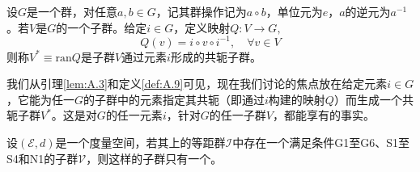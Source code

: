 \documentclass[../main.tex]{subfiles}
\begin{document}
\begin{definition}[共轭子群]\label{def:A.9}
    设$G$是一个群，对任意$a,b\in G$，记其群操作记为$a\circ b$，单位元为$e$，$a$的逆元为$a^{-1}$。若$V$是$G$的一个子群。给定$i\in G$，定义映射$Q:V\rightarrow G,$
    \[Q\left(v\right)=i\circ v\circ i^{-1},\quad\forall v\in V\]
    则称$V^*\equiv\mathrm{ran}Q$是子群$V$通过元素$i$形成的共轭子群。
\end{definition}

我们从引理\ref{lem:A.3}和定义\ref{def:A.9}可见，现在我们讨论的焦点放在给定元素$i\in G$，它能为任一$G$的子群中的元素指定其共轭（即通过$i$构建的映射$Q$）而生成一个共轭子群$V^*$。这是对$G$的任一元素$i$，针对$G$的任一子群$V$，都能享有的事实。

\begin{lemma}\label{lem:A.4}
    设$\left(\mathcal{E},d\right)$是一个度量空间，若其上的等距群$\mathcal{I}$中存在一个满足条件G1至G6、S1至S4和N1的子群$\mathcal{V}$，则这样的子群只有一个。
\end{lemma}
\end{document}
